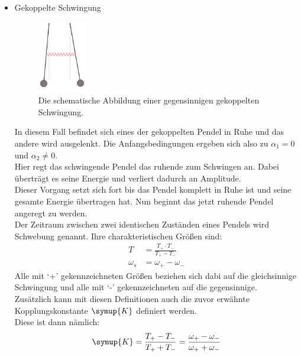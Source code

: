 \begin{itemize}
    \item {\Large Gekoppelte Schwingung\\}{
        \begin{figure}[H]
            \centering
            \includegraphics[width=0.2\textwidth]{latex/images/schwing3.PNG}
            \caption{Die schematische Abbildung einer gegensinnigen gekoppelten Schwingung\protect \cite{V106}.}
            \label{img:3}
        \end{figure}
        \noindent In diesem Fall befindet sich eines der gekoppelten Pendel in Ruhe und das andere wird ausgelenkt.
        Die Anfangsbedingungen ergeben sich also zu $\alpha_1=0$ und $\alpha_2 \neq 0$.\\
        Hier regt das schwingende Pendel das ruhende zum Schwingen an. Dabei überträgt es seine Energie und verliert dadurch an Amplitude.\\
        Dieser Vorgang setzt sich fort bis das Pendel komplett in Ruhe ist und seine gesamte Energie übertragen hat. Nun beginnt das jetzt ruhende Pendel angeregt zu werden.\\
        Der Zeitraum zwischen zwei identischen Zuständen eines Pendels wird Schwebung genannt. Ihre charakteristischen Größen sind:
        \begin{align*}
            T&=\frac{T_+ \cdot T_-}{T_+ - T_-} \\
            \omega_s&= \omega_+ -\omega_-
        \end{align*} 
        Alle mit \enquote*{+} gekennzeichneten Größen beziehen sich dabi auf die gleichsinnige Schwingung und alle mit \enquote*{-} gekennzeichneten auf die gegensinnige.\\
        Zusätzlich kann mit diesen Definitionen auch die zuvor erwähnte Kopplungskonstante $\symup{K}$ definiert werden.\\
        Diese ist dann nämlich:
        \begin{equation*}
            \symup{K}=\frac{T_+ - T_-}{T_+ + T_-}=\frac{\omega_+ -\omega_-}{\omega_+ + \omega_-}
        \end{equation*}

        
        }
\end{itemize}




